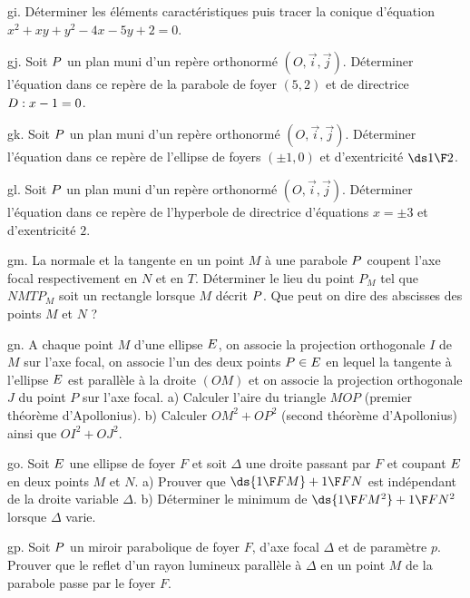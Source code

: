 \exo  [Level=1,Fight=0,Learn=0,Field=\Coniques,Type=\Exercices,Origin=] gi.  
Déterminer les éléments caractéristiques puis tracer la conique d'équation $x^2+xy+y^2-4x-5y+2=0$. 

\exo  [Level=1,Fight=0,Learn=0,Field=\Coniques,Type=\Exercices,Origin=] gj. 
Soit $\sc P$ un plan muni d'un repère orthonormé $(O,\vec i,\vec j)$. Déterminer l'équation dans ce repère de la parabole de foyer $(5,2)$ et de directrice $\sc D:x-1=0$. 

\exo   [Level=1,Fight=0,Learn=0,Field=\Coniques,Type=\Exercices,Origin=] gk. 
Soit $\sc P$ un plan muni d'un repère orthonormé $(O,\vec i,\vec j)$. Déterminer l'équation dans ce repère de l'ellipse de foyers $(\pm1,0)$ et d'exentricité ${\ds1\F2}$. 

\exo   [Level=1,Fight=0,Learn=0,Field=\Coniques,Type=\Exercices,Origin=] gl. 
Soit $\sc P$ un plan muni d'un repère orthonormé $(O,\vec i,\vec j)$. Déterminer l'équation dans ce repère de l'hyperbole de directrice d'équations $x=\pm3$ et d'exentricité $2$. 

\exo  [Level=1,Fight=1,Learn=0,Field=\Coniques,Type=\Exercices,Origin=] gm. 
La normale et la tangente en un point $M$  à une parabole $\sc P$ coupent l'axe focal respectivement en $N$ et en $T$. Déterminer le lieu du point $P_M$ tel que $NMTP_M$ soit un rectangle lorsque $M$ décrit $\sc P$. 
Que peut on dire des abscisses des points $M$ et $N$ ?

\exo  [Level=1,Fight=0,Learn=0,Field=\Coniques,Type=\Exercices,Origin=] gn. 
A chaque point $M$ d'une ellipse $\sc E$, on associe la projection orthogonale $I$ de $M$ sur l'axe focal, on associe l'un des deux points $P\in\sc E$ en lequel la tangente à l'ellipse $\sc E$ est parallèle à la droite $(OM)$ et on associe la projection orthogonale $J$ du point $P$ sur l'axe focal. \pn
a) Calculer l'aire du triangle $MOP$ (premier théorème d'Apollonius). \pn
b) Calculer $OM^2+OP^2$ (second théorème d'Apollonius) ainsi que $OI^2+OJ^2$. 

\exo  [Level=1,Fight=0,Learn=0,Field=\Coniques,Type=\Exercices,Origin=] go. 
Soit $\sc E$ une ellipse de foyer $F$ et soit $\Delta$ une droite passant par $F$ et coupant $\sc E$ en deux points $M$ et $N$. \pn
a) Prouver que $\ds {1\F FM}+{1\F FN}$ est indépendant de la droite variable $\Delta$. \pn
b) Déterminer le minimum de $\ds {1\F FM^2}+{1\F FN^2}$ lorsque $\Delta$ varie. 

\exo  [Level=1,Fight=0,Learn=0,Field=\Coniques,Type=\Exercices,Origin=,Indication={On pourra travailler dans le repère de centre $M$ d'axes la tangente et la normale en $M$ à la parabole.}] gp. 
Soit $\sc P$ un miroir parabolique de foyer $F$, d'axe focal $\Delta$ et de paramètre $p$.
Prouver que le reflet d'un rayon lumineux parallèle à $\Delta$ en un point $M$ de la parabole passe par le foyer $F$. 


